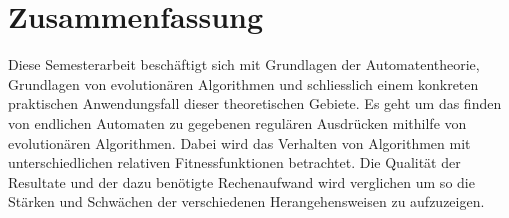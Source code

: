 \clearpage
{}
\vspace*{\fill}
\section*{\centering Zusammenfassung}
Diese Semesterarbeit beschäftigt sich mit Grundlagen der Automatentheorie, Grundlagen von evolutionären Algorithmen und schliesslich einem konkreten praktischen Anwendungsfall dieser theoretischen Gebiete. Es geht um das finden von endlichen Automaten zu gegebenen regulären Ausdrücken mithilfe von evolutionären Algorithmen. Dabei wird das Verhalten von Algorithmen mit unterschiedlichen relativen Fitnessfunktionen betrachtet. Die Qualität der Resultate und der dazu benötigte Rechenaufwand wird verglichen um so die Stärken und Schwächen der verschiedenen Herangehensweisen zu aufzuzeigen.
\vspace*{\fill}


